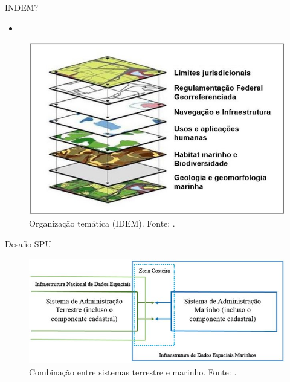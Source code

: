 \documentclass[9pt,ignorenonframetext,]{beamer}
\providecommand{\tightlist}{%
  \setlength{\itemsep}{0pt}\setlength{\parskip}{0pt}}
\begin{document}
\begin{frame}{INDEM?}
\protect\hypertarget{indem}{}

\begin{itemize}[<+->]
\tightlist
\item
  \textcite{IDEM}
\end{itemize}

\begin{figure}[H]

{\centering \includegraphics[width=0.7\linewidth]{images/Figura-4-Exemplo-da-organizacao-dos-temas-de-uma-IDEM_W640} 

}

\caption{Organização temática (IDEM). Fonte: \textcite{IDEM}.}\label{fig:unnamed-chunk-3}
\end{figure}

\end{frame}

\begin{frame}{Desafio SPU}
\protect\hypertarget{desafio-spu}{}

\begin{figure}[H]

{\centering \includegraphics[width=0.7\linewidth]{images/Figura-3-Combinacao-entre-os-sistemas-de-gerenciamento-terrestre-e-marinho_W640} 

}

\caption{Combinação entre sistemas terrestre e marinho. Fonte: \textcite{IDEM}.}\label{fig:unnamed-chunk-4}
\end{figure}

\end{frame}
\end{document}
